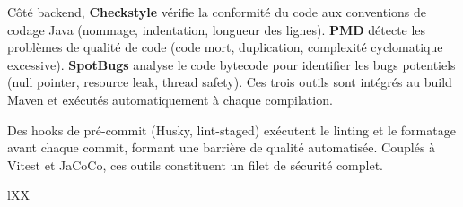Côté backend, \textbf{Checkstyle} vérifie la conformité du code aux conventions de codage Java (nommage, indentation, longueur des lignes). \textbf{PMD} détecte les problèmes de qualité de code (code mort, duplication, complexité cyclomatique excessive). \textbf{SpotBugs} analyse le code bytecode pour identifier les bugs potentiels (null pointer, resource leak, thread safety). Ces trois outils sont intégrés au build Maven et exécutés automatiquement à chaque compilation.

Des hooks de pré-commit (Husky, lint-staged) exécutent le linting et le formatage avant chaque commit, formant une barrière de qualité automatisée. Couplés à Vitest et JaCoCo, ces outils constituent un filet de sécurité complet.

\begin{table}[H]
    \centering
    \small
    \begin{xltabular}{\textwidth}{lXX}
        \toprule


\end{xltabular}
\end{table}
